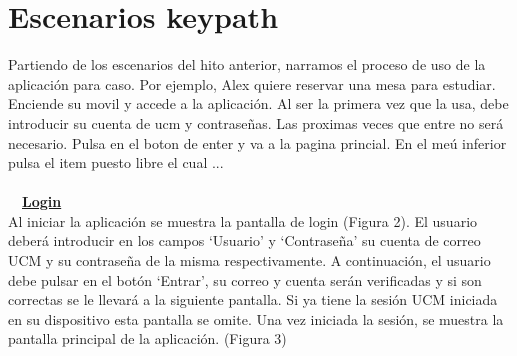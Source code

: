 \documentclass[12pt]{article}
\begin{document}
\section{Escenarios keypath}

Partiendo de los escenarios del hito anterior, narramos el proceso de uso de la aplicación para caso. Por ejemplo, Alex quiere reservar una mesa para estudiar. Enciende su movil y accede a la aplicación. Al ser la primera vez que la usa, debe introducir su cuenta de ucm y contraseñas. Las proximas veces que entre no será necesario. Pulsa en el boton de enter y va a la pagina princial. En el meú inferior pulsa el item puesto libre el cual ... 
\\\\
~~\textbf{\underline{Login}} 
 \\
Al iniciar la aplicación se muestra la pantalla de login (Figura 2). El usuario deberá introducir en los campos ‘Usuario’ y ‘Contraseña’ su cuenta de correo UCM y su contraseña de la misma respectivamente. A continuación, el usuario debe pulsar en el botón ‘Entrar’, su correo y cuenta serán verificadas y si son correctas se le llevará a la siguiente pantalla. Si ya tiene la sesión UCM iniciada en su dispositivo esta pantalla se omite. Una vez iniciada la sesión, se muestra la pantalla principal de la aplicación. (Figura 3)\\
\end{document}

